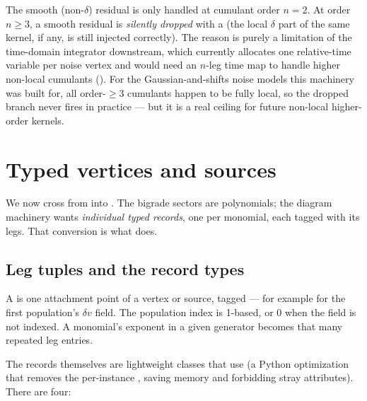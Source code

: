 \begin{gotcha}
The smooth (non-$\delta$) residual is only handled at cumulant order $n=2$. At order
$n\ge 3$, a smooth residual is \emph{silently dropped} with a 
(the local $\delta$ part of the same kernel, if any, is still injected correctly).
The reason is purely a limitation of the time-domain integrator downstream, which
currently allocates one relative-time variable per noise vertex and would need an
$n$-leg time map to handle higher non-local cumulants ().
For the Gaussian-and-shifts noise models this machinery was built for, all
order-$\ge 3$ cumulants happen to be fully local, so the dropped branch never fires
in practice --- but it is a real ceiling for future non-local higher-order kernels.
\end{gotcha}

\section{Typed vertices and sources}\label{sec:typed}

We now cross from  into . The bigrade
sectors are polynomials; the diagram machinery wants \emph{individual typed records},
one per monomial, each tagged with its legs. That conversion is what
 does.

\subsection{Leg tuples and the record types}

A  is one attachment point of a vertex or source, tagged
 --- for example  for the
first population's $\delta v$ field. The population index is 1-based, or $0$ when the
field is not indexed. A monomial's exponent in a given generator becomes that many
repeated leg entries.

The records themselves are lightweight classes that use  (a
Python optimization that removes the per-instance , saving memory
and forbidding stray attributes). There are four:

